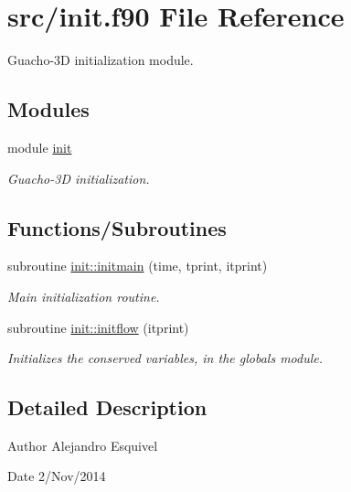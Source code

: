 \hypertarget{init_8f90}{}\section{src/init.f90 File Reference}
\label{init_8f90}


Guacho-\/3\+D initialization module.  


\subsection*{Modules}
\begin{DoxyCompactItemize}
\item 
module \hyperlink{namespaceinit}{init}
\begin{DoxyCompactList}\small\item\em Guacho-\/3\+D initialization. \end{DoxyCompactList}\end{DoxyCompactItemize}
\subsection*{Functions/\+Subroutines}
\begin{DoxyCompactItemize}
\item 
subroutine \hyperlink{namespaceinit_a14acb8c0d784a1c51d1a646ee4384e99}{init\+::initmain} (time, tprint, itprint)
\begin{DoxyCompactList}\small\item\em Main initialization routine. \end{DoxyCompactList}\item 
subroutine \hyperlink{namespaceinit_ab5415b25da1a9e732d3f557f4d6008b9}{init\+::initflow} (itprint)
\begin{DoxyCompactList}\small\item\em Initializes the conserved variables, in the globals module. \end{DoxyCompactList}\end{DoxyCompactItemize}


\subsection{Detailed Description}
\begin{DoxyAuthor}{Author}
Alejandro Esquivel 
\end{DoxyAuthor}
\begin{DoxyDate}{Date}
2/\+Nov/2014 
\end{DoxyDate}
